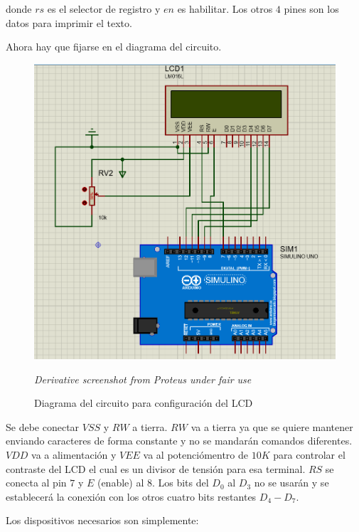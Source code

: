 \documentclass{article}
\begin{document}
    donde $rs$ es el selector de registro y $en$ es habilitar. Los otros $4$
    pines son los datos para imprimir el texto.

    \bigbreak

    Ahora hay que fijarse en el diagrama del circuito.

    \begin{figure}[H]
        \centering
        \includegraphics[width=0.6\paperwidth]{images/sim-schematic}
        \caption{Diagrama del circuito para configuración del LCD}\footnotesize
        \textit{Derivative screenshot from Proteus under fair use}\label{fig:figure3}
    \end{figure}

    Se debe conectar $VSS$ y $RW$ a tierra. $RW$ va a tierra ya que se quiere
    mantener enviando caracteres de forma constante y no se mandarán comandos
    diferentes. $VDD$ va a alimentación y $VEE$ va al potenciómentro de $10K$
    para controlar el contraste del LCD el cual es un divisor de tensión para
    esa terminal. $RS$ se conecta al pin $7$ y $E$ (enable) al $8$. Los bits
    del $D_0$ al $D_3$ no se usarán y se establecerá la conexión con los
    otros cuatro bits restantes $D_4-D_7$.

    \bigbreak

    Los dispositivos necesarios son simplemente:
\end{document}
